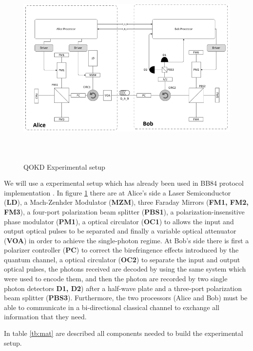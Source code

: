 \begin{figure}[hbt]
	\centering \includegraphics[width=1.1\textwidth,height=10cm]{./sdf/qokd_with_discrete_variables/figures/Experimental_setup.png}
	\caption{QOKD Experimental setup}\label{experimental_setup}
\end{figure}


We will use a experimental setup which has already been used in BB84 protocol implementation \cite{Wang16}. In figure \ref{experimental_setup} there are at Alice's side a Laser Semiconductor (\textbf{LD}), a Mach-Zenhder Modulator (\textbf{MZM}), three Faraday Mirrors (\textbf{FM1, FM2, FM3}), a four-port polarization beam splitter (\textbf{PBS1}), a polarization-insensitive phase modulator (\textbf{PM1}), a optical circulator (\textbf{OC1}) to allows the input and output optical pulses to be separated and finally a variable optical attenuator (\textbf{VOA}) in order to achieve the single-photon regime.
At Bob's side there is first a polarizer controller (\textbf{PC}) to correct the birefringence effects introduced by the quantum channel, a optical circulator (\textbf{OC2}) to separate the input and output optical pulses, the photons received are decoded by using the same system which were used to encode them, and then the photon are recorded by two single photon detectors \textbf{D1, D2}) after a half-wave plate and a three-port polarization beam splitter (\textbf{PBS3}).
Furthermore, the two processors (Alice and Bob) must be able to communicate in a bi-directional classical channel to exchange all information that they need.

In table \ref{tb:mat} are described all components needed to build the experimental setup.


